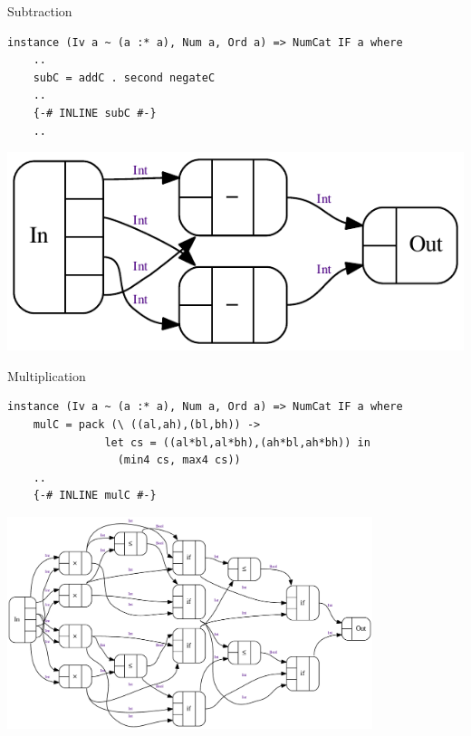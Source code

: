 \documentclass[10pt]{beamer}
\theoremstyle{definition}
\theoremstyle{remark}
\numberwithin{equation}{section}
\begin{document}
\begin{frame}[fragile]{Subtraction}
  \begin{lstlisting}[frame=single]
  instance (Iv a ~ (a :* a), Num a, Ord a) => NumCat IF a where
    ..
    subC = addC . second negateC
    ..
    {-# INLINE subC #-}
    ..
  \end{lstlisting}
  \includegraphics{sub-iv.pdf}
\end{frame}

\begin{frame}[fragile]{Multiplication}
  \begin{lstlisting}[frame=single]
  instance (Iv a ~ (a :* a), Num a, Ord a) => NumCat IF a where
    mulC = pack (\ ((al,ah),(bl,bh)) ->
               let cs = ((al*bl,al*bh),(ah*bl,ah*bh)) in
                 (min4 cs, max4 cs))
    ..
    {-# INLINE mulC #-}
  \end{lstlisting}
  \begin{center}
    \includegraphics[width=0.8\textwidth]{mul-iv.pdf}
  \end{center}
\end{frame}
\end{document}
